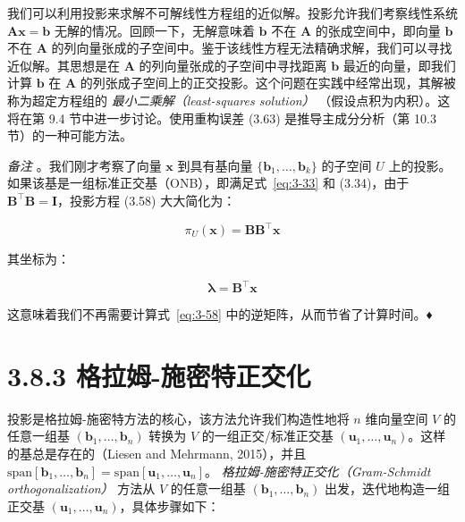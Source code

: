 我们可以利用投影来求解不可解线性方程组的近似解。投影允许我们考察线性系统 $ \boldsymbol{A} \boldsymbol{x} = \boldsymbol{b} $ 无解的情况。回顾一下，无解意味着 $ \boldsymbol{b} $ 不在 $ \boldsymbol{A} $ 的张成空间中，即向量 $ \boldsymbol{b} $ 不在 $ \boldsymbol{A} $ 的列向量张成的子空间中。鉴于该线性方程无法精确求解，我们可以寻找近似解。其思想是在 $ \boldsymbol{A} $ 的列向量张成的子空间中寻找距离 $ \boldsymbol{b} $ 最近的向量，即我们计算 $ \boldsymbol{b} $ 在 $ \boldsymbol{A} $ 的列张成子空间上的正交投影。这个问题在实践中经常出现，其解被称为超定方程组的 \emph{最小二乘解（least-squares solution）} （假设点积为内积）。这将在第 9.4 节中进一步讨论。使用重构误差 (3.63) 是推导主成分分析（第 10.3 节）的一种可能方法。

\emph{备注} 。我们刚才考察了向量 $ \boldsymbol{x} $ 到具有基向量 $ \{\boldsymbol{b}_1, \ldots, \boldsymbol{b}_k\} $ 的子空间 $ U $ 上的投影。如果该基是一组标准正交基（ONB），即满足式~\eqref{eq:3-33} 和 (3.34)，由于 $ \boldsymbol{B}^\top \boldsymbol{B} = \boldsymbol{I} $，投影方程 (3.58) 大大简化为：

\begin{equation}
\pi_U(\boldsymbol{x}) = \boldsymbol{B} \boldsymbol{B}^\top \boldsymbol{x}
\tag{3.65}\label{eq:3-65}
\end{equation}

其坐标为：

\begin{equation}
\boldsymbol{\lambda} = \boldsymbol{B}^\top \boldsymbol{x}
\tag{3.66}\label{eq:3-66}
\end{equation}

这意味着我们不再需要计算式~\eqref{eq:3-58} 中的逆矩阵，从而节省了计算时间。♦

\section*{3.8.3 格拉姆-施密特正交化}

投影是格拉姆-施密特方法的核心，该方法允许我们构造性地将 $ n $ 维向量空间 $ V $ 的任意一组基 $ (\boldsymbol{b}_1, \ldots, \boldsymbol{b}_n) $ 转换为 $ V $ 的一组正交/标准正交基 $ (\boldsymbol{u}_1, \ldots, \boldsymbol{u}_n) $。这样的基总是存在的（Liesen and Mehrmann, 2015），并且 $ \text{span}[\boldsymbol{b}_1, \ldots, \boldsymbol{b}_n] = \text{span}[\boldsymbol{u}_1, \ldots, \boldsymbol{u}_n] $。 \emph{格拉姆-施密特正交化（Gram-Schmidt orthogonalization）} 方法从 $ V $ 的任意一组基 $ (\boldsymbol{b}_1, \ldots, \boldsymbol{b}_n) $ 出发，迭代地构造一组正交基 $ (\boldsymbol{u}_1, \ldots, \boldsymbol{u}_n) $，具体步骤如下：

